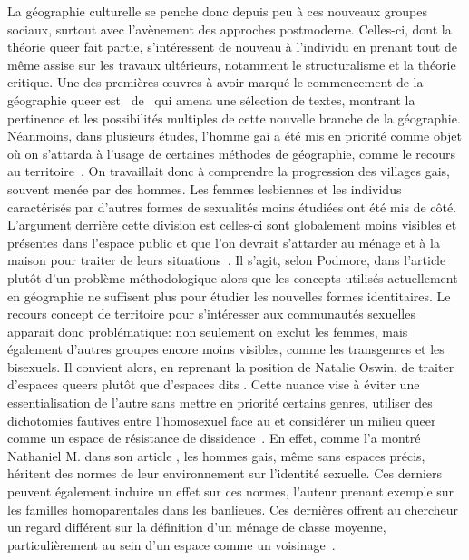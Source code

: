 La géographie culturelle se penche donc depuis peu à ces nouveaux groupes sociaux, surtout avec l'avènement des approches postmoderne.  
Celles-ci, dont la théorie queer fait partie, s'intéressent de nouveau à l'individu en prenant tout de même assise sur les travaux ultérieurs, notamment le structuralisme et la théorie critique. 
Une des premières œuvres à avoir marqué le commencement de la géographie queer est~ de~\citet{Bell1994} qui amena une sélection de textes, montrant la pertinence et les possibilités multiples de cette nouvelle branche de la géographie. 
Néanmoins, dans plusieurs études, l'homme gai a été mis en priorité comme objet où on s'attarda à l'usage de certaines méthodes de géographie, comme le recours au territoire~\citep{Podmore2001,Oswin2008}. 
On travaillait donc à comprendre la progression des villages gais, souvent menée par des hommes.
Les femmes lesbiennes et les individus caractérisés par d'autres formes de sexualités moins étudiées ont été mis de côté.
L'argument derrière cette division est celles-ci sont globalement moins visibles et présentes dans l'espace public et que l'on devrait s'attarder au ménage et à la maison pour traiter de leurs situations~\citep[333-334]{Podmore2001}. 
Il s'agit, selon Podmore, dans l'article  plutôt d'un problème méthodologique alors que les concepts utilisés actuellement en géographie ne suffisent plus pour étudier les nouvelles formes identitaires. 
Le recours concept de territoire  pour s'intéresser aux communautés sexuelles apparait donc problématique: non seulement on exclut les femmes, mais également d'autres groupes encore moins visibles, comme les transgenres et les bisexuels. 
Il convient alors, en reprenant la position de Natalie Oswin, de traiter d'espaces queers plutôt que d'espaces dits \lgbt.
Cette nuance vise à éviter une essentialisation de l'autre sans mettre en priorité certains genres, utiliser des dichotomies fautives entre l'homosexuel face au  et considérer  un milieu queer comme un espace de résistance de dissidence~\citep{Oswin2008}. 
En effet, comme l'a montré Nathaniel M. \citet{Lewis2011} dans son article , les hommes gais, même sans espaces précis, héritent des normes de leur environnement sur l'identité sexuelle. 
Ces derniers peuvent également induire un effet sur ces normes, l'auteur prenant exemple sur les familles homoparentales dans les banlieues. 
Ces dernières offrent au chercheur un regard différent sur la définition d'un ménage de classe moyenne, particulièrement au sein d'un espace comme un voisinage~\citep[304]{Lewis2011}.

